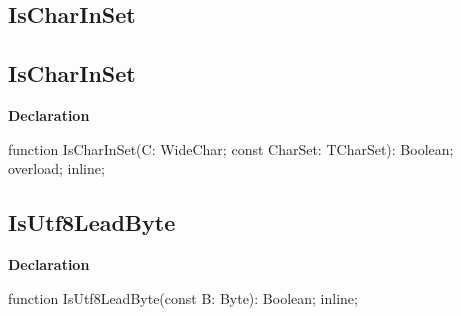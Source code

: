 \documentclass{report}
\newif\ifpdf
\begin{document}
\subsection*{\large{\textbf{IsCharInSet}}\normalsize\hspace{1ex}\hrulefill}
\else
\subsection*{IsCharInSet}
\fi
\label{PasDoc_Utils-IsCharInSet}
\begin{list}{}{
\setlength{\itemindent}{0cm}
\setlength{\listparindent}{0cm}
\setlength{\leftmargin}{\evensidemargin}
\addtolength{\leftmargin}{\tmplength}
\settowidth{\labelsep}{X}
\addtolength{\leftmargin}{\labelsep}
\setlength{\labelwidth}{\tmplength}
}
\item[\textbf{Declaration}\hfill]
\ifpdf
\begin{flushleft}
\fi
\begin{ttfamily}
function IsCharInSet(C: WideChar; const CharSet: TCharSet): Boolean; overload; inline;\end{ttfamily}

\ifpdf
\end{flushleft}
\fi

\end{list}
\ifpdf
\subsection*{\large{\textbf{IsUtf8LeadByte}}\normalsize\hspace{1ex}\hrulefill}
\else
\subsection*{IsUtf8LeadByte}
\fi
\label{PasDoc_Utils-IsUtf8LeadByte}
\begin{list}{}{
\setlength{\itemindent}{0cm}
\setlength{\listparindent}{0cm}
\setlength{\leftmargin}{\evensidemargin}
\addtolength{\leftmargin}{\tmplength}
\settowidth{\labelsep}{X}
\addtolength{\leftmargin}{\labelsep}
\setlength{\labelwidth}{\tmplength}
}
\item[\textbf{Declaration}\hfill]
\ifpdf
\begin{flushleft}
\fi
\begin{ttfamily}
function IsUtf8LeadByte(const B: Byte): Boolean; inline;\end{ttfamily}

\ifpdf
\end{flushleft}
\fi

\end{list}
\ifpdf
\end{document}
